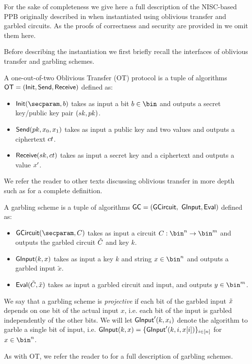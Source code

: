 For the sake of completeness we give here a full description of the NISC-based PPB originally described in \cite{EC:KohLysNgu23} when instantiated using oblivious transfer and garbled circuits.
As the proofs of correctness and security are provided in \cite{EC:KohLysNgu23} we omit them here.

Before describing the instantiation we first briefly recall the interfaces of oblivious transfer and garbling schemes.

\begin{definition}
	A one-out-of-two Oblivious Transfer (OT) protocol is a tuple of algorithms $\mathsf{OT} = (\mathsf{Init}, \mathsf{Send}, \mathsf{Receive})$ defined as:
	\begin{itemize}
		\item $\otinit(\secparam, b)$ takes as input a bit $b \in \bin$ and outputs a secret key/public key pair $(sk, pk)$.
		\item $\mathsf{Send}(pk, x_0, x_1)$ takes as input a public key and two values and outputs a ciphertext $ct$.
		\item $\mathsf{Receive}(sk, ct)$ takes as input a secret key and a ciphertext and outputs a value $x'$.
	\end{itemize}

	We refer the reader to other texts discussing oblivious transfer in more depth such as \cite{EC:Kalai05} for a complete definition.
\end{definition}


\begin{definition}
	A garbling scheme is a tuple of algorithms $\mathsf{GC} = (\mathsf{GCircuit},$ $\mathsf{GInput}, \mathsf{Eval})$ defined as:
	\begin{itemize}
		\item $\gcircuit(\secparam, \circuit)$ takes as input a circuit $\circuit: \bin^n \rightarrow \bin^m$ and outputs the garbled circuit $\tilde{C}$ and key $k$.
		\item $\mathsf{GInput}(k, x)$ takes as input a key $k$ and string $x \in \bin^n$ and outputs a garbled input $\tilde{x}$.
		\item $\mathsf{Eval}(\tilde{C}, \tilde{x})$ takes as input a garbled circuit and input, and outputs $y \in \bin^m$.
	\end{itemize}

	We say that a garbling scheme is \emph{projective} if each bit of the garbled input $\tilde{x}$ depends on one bit of the actual input $x$, i.e. each bit of the input is garbled independently of the other bits.
	We will let $\mathsf{GInput}'(k, x_i)$ denote the algorithm to garble a single bit of input, i.e.
	$\mathsf{GInput}(k, x) = \{\mathsf{GInput}'(k, i, x[i])\}_{i \in [n]}$ for $x \in \bin^n$.

	As with OT, we refer the reader to \cite{CCS:BelHoaRog12} for a full description of garbling schemes.
\end{definition}

